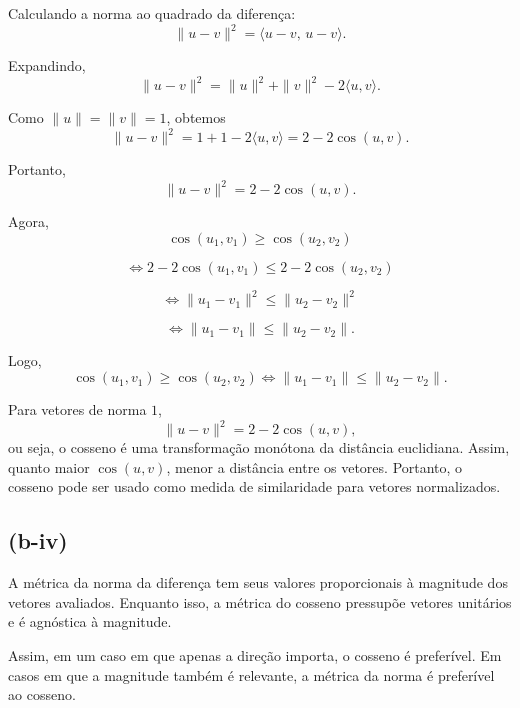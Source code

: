 Calculando a norma ao quadrado da diferença:
\[
    \|u-v\|^2
    =
    \langle u-v,\,u-v\rangle.
\]

Expandindo,
\[
    \|u-v\|^2
    =
    \|u\|^2+\|v\|^2-2\langle u,v\rangle.
\]

Como $\|u\|=\|v\|=1$, obtemos
\[
    \|u-v\|^2
    =
    1+1-2\langle u,v\rangle
    =
    2-2\cos(u,v).
\]

Portanto,
\[
    \|u-v\|^2 = 2-2\cos(u,v).
\]

Agora,
\[
    \cos(u_1,v_1)\geq \cos(u_2,v_2)
\]

\[
    \iff
    2-2\cos(u_1,v_1)\leq 2-2\cos(u_2,v_2)
\]

\[
    \iff
    \|u_1-v_1\|^2 \leq \|u_2-v_2\|^2
\]

\[
    \iff
    \|u_1-v_1\| \leq \|u_2-v_2\|.
\]

Logo,
\[
    \cos(u_1,v_1) \geq \cos(u_2,v_2)
    \iff
    \|u_1 - v_1\| \leq \|u_2 - v_2\|.
\]


Para vetores de norma $1$,
\[
    \|u-v\|^2 = 2-2\cos(u,v),
\]
ou seja, o cosseno é uma transformação monótona da distância euclidiana.
Assim, quanto maior $\cos(u,v)$, menor a distância entre os vetores.
Portanto, o cosseno pode ser usado como medida de similaridade para vetores normalizados.

\subsection*{(b-iv)}

\vspace{0.5em}
\noindent A métrica da norma da diferença tem seus valores proporcionais à magnitude dos vetores avaliados. Enquanto isso, a métrica do cosseno pressupõe vetores unitários e é agnóstica à magnitude.

\noindent Assim, em um caso em que apenas a direção importa, o cosseno é preferível. Em casos em que a magnitude também é relevante, a métrica da norma é preferível ao cosseno.

